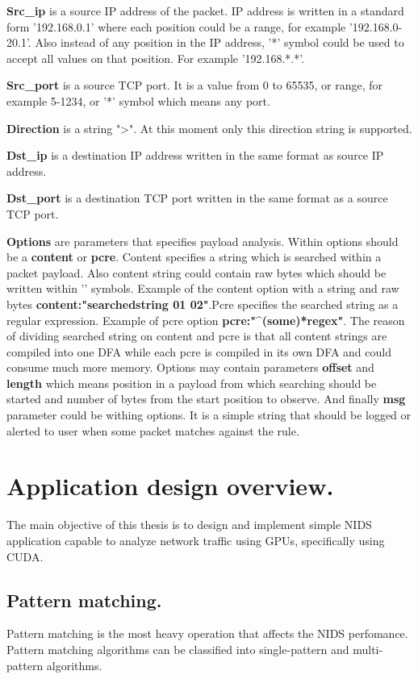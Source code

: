 \documentclass[thesis=M,english]{FITthesis}[2011/07/15]
\begin{document}
\textbf{Src\_ip} is a source IP address of the packet. IP address is written in a standard form '192.168.0.1' where each position could be a range, for example '192.168.0-20.1'. Also instead of any position in the IP address, '*' symbol could be used to accept all values on that position. For example '192.168.*.*'.

\textbf{Src\_port} is a source TCP port. It is a value from 0 to 65535, or range, for example 5-1234, or '*' symbol which means any port.

\textbf{Direction} is a string "\textendash\textgreater". At this moment only this direction string is supported.

\textbf{Dst\_ip} is a destination IP address written in the same format as source IP address.

\textbf{Dst\_port} is a destination TCP port written in the same format as a source TCP port.

\textbf{Options} are parameters that specifies payload analysis. Within options should be a \textbf{content} or \textbf{pcre}. Content specifies a string which is searched within a packet payload. Also content string could contain raw bytes which should be written within '\textbar' symbols. Example of the content option with a string and raw bytes \textbf{content:"searchedstring 01 02\textbar"}.\newline Pcre specifies the searched string as a regular expression. Example of pcre option \textbf{pcre:"\textasciicircum(some)*regex"}. The reason of dividing searched string on content and pcre is that all content strings are compiled into one DFA while each pcre is compiled in its own DFA and could consume much more memory. Options may contain parameters \textbf{offset} and \textbf{length} which means position in a payload from which searching should be started and number of bytes from the start position to observe. And finally \textbf{msg} parameter could be withing options. It is a simple string that should be logged or alerted to user when some packet matches against the rule.

\section{Application design overview.}
The main objective of this thesis is to design and implement simple NIDS application capable to analyze network traffic using GPUs, specifically using CUDA. 
\subsection*{Pattern matching.}
Pattern matching is the most heavy operation that affects the NIDS perfomance. Pattern matching algorithms can be classified into single-pattern and multi-pattern algorithms.
\end{document}
